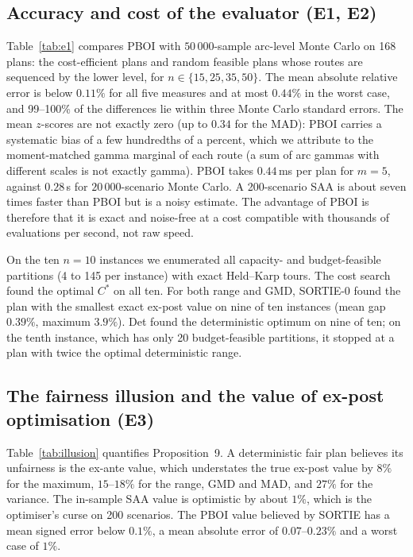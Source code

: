 \documentclass[11pt]{article}
\begin{document}
\subsection{Accuracy and cost of the evaluator (E1, E2)}
Table~\ref{tab:e1} compares PBOI with $50\,000$-sample arc-level Monte Carlo
on 168 plans: the cost-efficient plans and random feasible plans whose
routes are sequenced by the lower level, for $n\in\{15,25,35,50\}$. The mean absolute
relative error is below $0.11\%$ for all five measures and at most $0.44\%$ in
the worst case, and 99--100\% of the differences lie within three Monte Carlo
standard errors. The mean $z$-scores are not exactly zero (up to $0.34$ for the
MAD): PBOI carries a systematic bias of a few hundredths of a percent, which
we attribute to the moment-matched gamma marginal of each route (a sum of arc
gammas with different scales is not exactly gamma). PBOI takes $0.44$\,ms per plan for $m=5$, against
$0.28$\,s for $20\,000$-scenario Monte Carlo. A 200-scenario SAA is about
seven times faster than PBOI but is a noisy estimate. The advantage of PBOI is
therefore that it is exact and noise-free at a cost compatible with thousands
of evaluations per second, not raw speed.

\begin{table}[t]\centering\small
\caption{E1: PBOI against arc-level Monte Carlo ($50\,000$ samples) on 168 plans; $z$: difference over its Monte Carlo standard error.}\label{tab:e1}

\end{table}

On the ten $n=10$ instances we enumerated all capacity- and budget-feasible
partitions (4 to 145 per instance) with exact Held--Karp tours. The cost
search found the optimal $C^\ast$ on all ten. For both range and GMD, SORTIE-0
found the plan with the smallest exact ex-post value on nine of ten
instances (mean gap $0.39\%$, maximum $3.9\%$). Det found the deterministic
optimum on nine of ten; on the tenth instance, which has only 20
budget-feasible partitions, it stopped at a plan with twice the optimal
deterministic range.

\subsection{The fairness illusion and the value of ex-post optimisation (E3)}
Table~\ref{tab:illusion} quantifies Proposition~9. A
deterministic fair plan believes its unfairness is the ex-ante value, which
understates the true ex-post value by $8\%$ for the maximum, $15$--$18\%$ for
the range, GMD and MAD, and $27\%$ for the variance. The in-sample SAA value is optimistic by
about $1\%$, which is the optimiser's curse on 200 scenarios. The PBOI value
believed by SORTIE has a mean signed error below $0.1\%$, a mean absolute
error of $0.07$--$0.23\%$ and a worst case of $1\%$.
\end{document}
